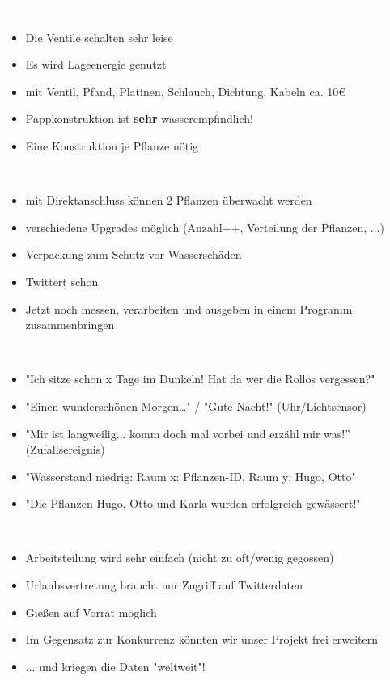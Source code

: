 \documentclass[bigger]{beamer}
\newcommand{\topic}[1]{{\huge{\textcolor{white}{\textbf{#1}}}}}
\begin{document}
\begin{frame}{\topic{Bewässerung}}
	\begin{itemize}
		\item Die Ventile schalten sehr leise
		\item Es wird Lageenergie genutzt
		\item mit Ventil, Pfand, Platinen, Schlauch, Dichtung, Kabeln ca. 10\euro
		\newline
		\item Pappkonstruktion ist \textbf{sehr} wasserempfindlich!
		\item Eine Konstruktion je Pflanze nötig
	\end{itemize}
\end{frame} 


\begin{frame}{\topic{Arduino}}
	\begin{itemize}
		\item mit Direktanschluss können 2 Pflanzen überwacht werden
		\item verschiedene Upgrades möglich (Anzahl++, Verteilung der Pflanzen, ...)
		\item Verpackung zum Schutz vor Wasserschäden
		\item Twittert schon
		\newline
		\item Jetzt noch messen, verarbeiten und ausgeben in einem Programm zusammenbringen
	\end{itemize}
\end{frame}

\begin{frame}{\topic{Tweets}}
	\begin{itemize}
		\item "Ich sitze schon x Tage im Dunkeln! Hat da wer die Rollos vergessen?"
		\item "Einen wunderschönen Morgen…" / "Gute Nacht!" (Uhr/Lichtsensor)
		\item "Mir ist langweilig... komm doch mal vorbei und erzähl mir was!” (Zufallsereignis)
		\item "Wasserstand niedrig: Raum x: Pflanzen-ID, Raum y: Hugo, Otto"
		\item "Die Pflanzen Hugo, Otto und Karla wurden erfolgreich gewässert!"
	\end{itemize}
\end{frame}


\begin{frame}{\topic{Vorteile}}
	\begin{itemize}
		\item Arbeitsteilung wird sehr einfach (nicht zu oft/wenig gegossen)
		\item Urlaubsvertretung braucht nur Zugriff auf Twitterdaten
		\item Gießen auf Vorrat möglich
		\item Im Gegensatz zur Konkurrenz könnten wir unser Projekt frei erweitern
		\item ... und kriegen die Daten "weltweit"!
	\end{itemize}
\end{frame}
\end{document}
